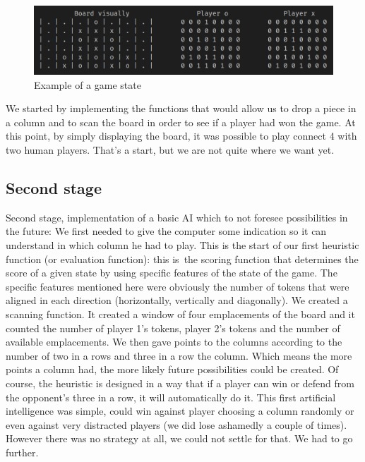 \documentclass[12pt, a4paper, oneside]{report}
\begin{document}
	\begin{figure}[h]
		\includegraphics[scale=0.4]{example.png}
		\centering
		\caption{Example of a game state}\label{fig:example_game_state}
	\end{figure}

	We started by implementing the functions that would allow us to drop a piece in a column and to scan the board in order to see if a player had won the game. At this point, by simply displaying the board, it was possible to play connect 4 with two human players. That’s a start, but we are not quite where we want yet. \\

	\subsection{Second stage}
	Second stage, implementation of a basic AI which to not foresee possibilities in the future:
	We first needed to give the computer some indication so it can understand in which column he had to play. This is the start of our first heuristic function (or evaluation function): this is the scoring function that determines the score of a given state by using specific features of the state of the game. The specific features mentioned here were obviously the number of tokens that were aligned in each direction (horizontally, vertically and diagonally). We created a scanning function. It created a window of four emplacements of the board and it counted the number of player 1’s tokens, player 2’s tokens and the number of available emplacements. We then gave points to the columns according to the number of two in a rows and three in a row the column. Which means the more points a column had, the more likely future possibilities could be created. Of course, the heuristic is designed in a way that if a player can win or defend from the opponent’s three in a row, it will automatically do it.
	This first artificial intelligence was simple, could win against player choosing a column randomly or even against very distracted players (we did lose ashamedly a couple of times). However there was no strategy at all, we could not settle for that. We had to go further. \\
\end{document}
